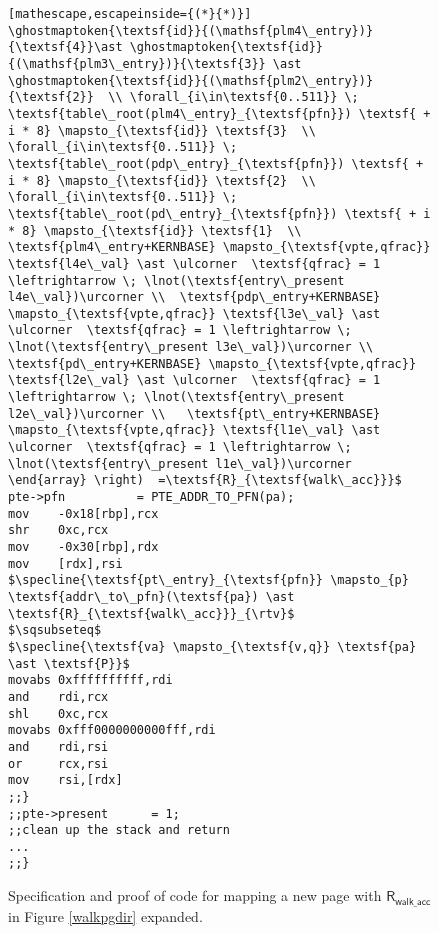 \begin{figure}
\begin{lstlisting}[mathescape,escapeinside={(*}{*)}]
\ghostmaptoken{\textsf{id}}{(\mathsf{plm4\_entry})}{\textsf{4}}\ast \ghostmaptoken{\textsf{id}}{(\mathsf{plm3\_entry})}{\textsf{3}} \ast \ghostmaptoken{\textsf{id}}{(\mathsf{plm2\_entry})}{\textsf{2}}  \\ \forall_{i\in\textsf{0..511}} \; \textsf{table\_root(plm4\_entry}_{\textsf{pfn}}) \textsf{ + i * 8} \mapsto_{\textsf{id}} \textsf{3}  \\ \forall_{i\in\textsf{0..511}} \; \textsf{table\_root(pdp\_entry}_{\textsf{pfn}}) \textsf{ + i * 8} \mapsto_{\textsf{id}} \textsf{2}  \\ \forall_{i\in\textsf{0..511}} \; \textsf{table\_root(pd\_entry}_{\textsf{pfn}}) \textsf{ + i * 8} \mapsto_{\textsf{id}} \textsf{1}  \\  \textsf{plm4\_entry+KERNBASE} \mapsto_{\textsf{vpte,qfrac}} \textsf{l4e\_val} \ast \ulcorner  \textsf{qfrac} = 1 \leftrightarrow \; \lnot(\textsf{entry\_present l4e\_val})\urcorner \\  \textsf{pdp\_entry+KERNBASE} \mapsto_{\textsf{vpte,qfrac}} \textsf{l3e\_val} \ast \ulcorner  \textsf{qfrac} = 1 \leftrightarrow \; \lnot(\textsf{entry\_present l3e\_val})\urcorner \\  \textsf{pd\_entry+KERNBASE} \mapsto_{\textsf{vpte,qfrac}} \textsf{l2e\_val} \ast \ulcorner  \textsf{qfrac} = 1 \leftrightarrow \; \lnot(\textsf{entry\_present l2e\_val})\urcorner \\   \textsf{pt\_entry+KERNBASE} \mapsto_{\textsf{vpte,qfrac}} \textsf{l1e\_val} \ast \ulcorner  \textsf{qfrac} = 1 \leftrightarrow \; \lnot(\textsf{entry\_present l1e\_val})\urcorner    \end{array} \right)  =\textsf{R}_{\textsf{walk\_acc}}}$
pte->pfn          = PTE_ADDR_TO_PFN(pa);
mov    -0x18[rbp],rcx
shr    0xc,rcx
mov    -0x30[rbp],rdx
mov    [rdx],rsi
$\specline{\textsf{pt\_entry}_{\textsf{pfn}} \mapsto_{p} \textsf{addr\_to\_pfn}(\textsf{pa}) \ast \textsf{R}_{\textsf{walk\_acc}}}_{\rtv}$
$\sqsubseteq$
$\specline{\textsf{va} \mapsto_{\textsf{v,q}} \textsf{pa} \ast \textsf{P}}$
movabs 0xffffffffff,rdi
and    rdi,rcx
shl    0xc,rcx
movabs 0xfff0000000000fff,rdi
and    rdi,rsi
or     rcx,rsi
mov    rsi,[rdx]
;;}
;;pte->present      = 1;
;;clean up the stack and return
...
;;}
\end{lstlisting}
  \caption{Specification and proof of code for mapping a new page with $\textsf{R}_{\textsf{walk\_acc}}$ in Figure \ref{walkpgdir} expanded.}
\label{fig:mapping_code}
\end{figure}


